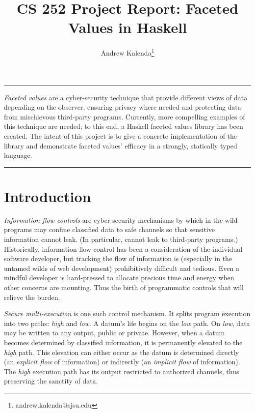 \documentclass[12pt,a4paper]{article}
\renewenvironment{abstract}{%
	\hfill\begin{minipage}{0.95\textwidth}
		\rule{\textwidth}{1pt}}
	{\par\noindent\rule{\textwidth}{1pt}\end{minipage}}
\begin{document}
	\title{CS 252 Project Report: Faceted Values in Haskell}
	\author[1]{Andrew Kalenda\thanks{andrew.kalenda@sjsu.edu}}
	\maketitle
	\begin{abstract}
		\textit{Faceted values} are a cyber-security technique that provide different views of data depending on the observer, ensuring privacy where needed and protecting data from mischievous third-party programs. Currently, more compelling examples of this technique are needed; to this end, a Haskell faceted values library has been created. The intent of this project is to give a concrete implementation of the library and demonstrate faceted values' efficacy in a strongly, statically typed language.
	\end{abstract}
	
	\section{Introduction}
		\textit{Information flow controls}\cite{DenningDenning1977} are cyber-security mechanisms by which in-the-wild programs may confine classified data to safe channels so that sensitive information cannot leak. (In particular, cannot leak to third-party programs.) Historically, information flow control has been a consideration of the individual software developer, but tracking the flow of information is (especially in the untamed wilds of web development) prohibitively difficult and tedious. Even a mindful developer is hard-pressed to allocate precious time and energy when other concerns are mounting. Thus the birth of programmatic controls that will relieve the burden.
		
		\textit{Secure multi-execution}\cite{DevriesePiessens2010, JaskelioffRusso2012, RafnssonSabelfeld2013} is one such control mechanism. It splits program execution into two paths: \textit{high} and \textit{low}. A datum's life begins on the \textit{low} path. On \textit{low}, data may be written to any output, public or private. However, when a datum becomes determined by classified information, it is permanently elevated to the \textit{high} path. This elevation can either occur as the datum is determined directly (an \textit{explicit flow} of information) or indirectly (an \textit{implicit flow} of information). The \textit{high} execution path has its output restricted to authorized channels, thus preserving the sanctity of data. 
		
\end{document}
